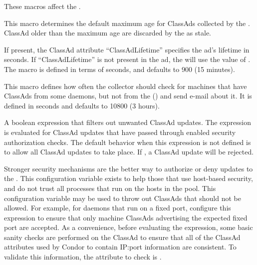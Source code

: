 These macros affect the .
\begin{description}
  
\label{param:ClassadLifetime}
\item[\Macro{CLASSAD\_LIFETIME}]
  This macro determines the default maximum age for ClassAds collected by the
  .  ClassAd older than the maximum age are
  discarded by the  as stale.

  If present, the ClassAd attribute ``ClassAdLifetime'' specifies the
  ad's lifetime in seconds.  If ``ClassAdLifetime'' is not present in
  the ad, the  will use the value of
  .  The macro is defined in terms of
  seconds, and defaults to 900 (15 minutes).
  
\label{param:MasterCheckInterval}
\item[\Macro{MASTER\_CHECK\_INTERVAL}]
  This macro defines how often the
  collector should check for machines that have ClassAds from some
  daemons, but not from the  ()
  and send e-mail about it.  It is defined in seconds and 
  defaults to 10800 (3 hours).

\label{param:CollectorRequirements}
\item[\Macro{COLLECTOR\_REQUIREMENTS}]
  A boolean expression that filters out unwanted ClassAd updates.  The
  expression is evaluated for ClassAd updates that have 
  passed through enabled security authorization checks.
  The default behavior when this expression is not
  defined is to allow all ClassAd updates to take place.
  If , a ClassAd update will be rejected.

  Stronger security mechanisms are the better way to
  authorize or deny updates to the .
  This configuration variable exists to help those that
  use host-based security, and
  do not trust all processes that run on the hosts in the pool.
  This configuration variable may be used to throw out ClassAds that
  should not be allowed.  For example, for
   daemons that run on a fixed port,
  configure this expression to ensure that 
  only machine ClassAds advertising the expected
  fixed port are accepted.  As a convenience, before evaluating the
  expression, some basic sanity checks are performed on the ClassAd to
  ensure that all of the ClassAd attributes used by Condor to contain
  IP:port information are consistent.  To validate this
  information, the attribute to check is .
 


\end{description}
